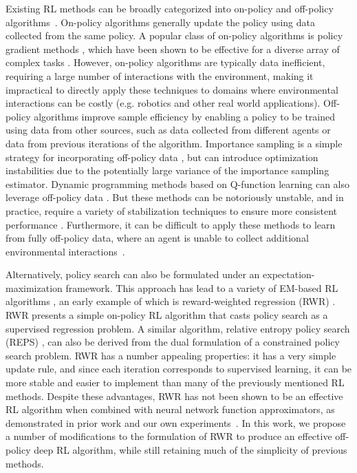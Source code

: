 Existing RL methods can be broadly categorized into on-policy and off-policy algorithms~\citep{Sutton1998}. On-policy algorithms generally update the policy using data collected from the same policy. A popular class of on-policy algorithms is policy gradient methods \citep{Williams1992,PoliGrad1999}, which have been shown to be effective for a diverse array of complex tasks \citep{HeessTSLMWTEWER17,Pathak2017,2018-TOG-deepMimic,Rajeswaran-RSS-18}. However, on-policy algorithms are typically data inefficient, requiring a large number of interactions with the environment, making it impractical to directly apply these techniques to domains where environmental interactions can be costly (e.g. robotics and other real world applications). Off-policy algorithms improve sample efficiency by enabling a policy to be trained using data from other sources, such as data collected from different agents or data from previous iterations of the algorithm. Importance sampling is a simple strategy for incorporating off-policy data \citep{Sutton1998,Meuleau00off,Hachiya2009}, but can introduce optimization instabilities due to the potentially large variance of the importance sampling estimator. Dynamic programming methods based on Q-function learning can also leverage off-policy data \citep{Precup2001,mnih2015humanlevel,DDPG2016,NAF16,haarnoja18b}. But these methods can be notoriously unstable, and in practice, require a variety of stabilization techniques to ensure more consistent performance \citep{Hasselt2016,WangBHMMKF16,Munos2016,RainbowDQN2017,fujimoto18a,nachum2018learning,fu19diagnosing}. Furthermore, it can be difficult to apply these methods to learn from fully off-policy data, where an agent is unable to collect additional environmental interactions~\citep{fujimoto19offpolicy, BEAR2019}.

Alternatively, policy search can also be formulated under an expectation-maximization framework. This approach has lead to a variety of EM-based RL algorithms \citep{Peters2010REP,Neumann2011,abdolmaleki2018maximum}, an early example of which is reward-weighted regression (RWR) \citep{Peters2007RWR}. RWR presents a simple on-policy RL algorithm that casts policy search as a supervised regression problem. A similar algorithm, relative entropy policy search (REPS) \citep{Peters2010REP}, can also be derived from the dual formulation of a constrained policy search problem. RWR has a number appealing properties: it has a very simple update rule, and  since each iteration corresponds to supervised learning, it can be more stable and easier to implement than many of the previously mentioned RL methods. Despite these advantages, RWR has not been shown to be an effective RL algorithm when combined with neural network function approximators, as demonstrated in prior work and our own experiments~\citep{TRPOschulman15,DuanCHSA16}. In this work, we propose a number of modifications to the formulation of RWR to produce an effective off-policy deep RL algorithm, while still retaining much of the simplicity of previous methods.


